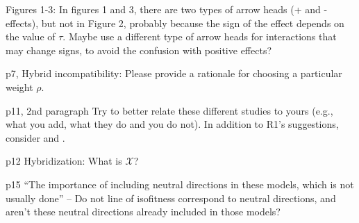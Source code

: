 \begin{point}{Figures 1-3:}
    In figures 1 and 3, there are two types of arrow heads (+ and -
effects), but not in Figure 2, probably because the sign of the effect depends
on the value of $\tau$. Maybe use a  different type of arrow heads for
interactions that may change signs, to avoid the confusion with positive
effects?
\end{point}


\begin{point}{p7, Hybrid incompatibility:}
    Please provide a rationale for choosing a particular weight $\rho$.
\end{point}


\begin{point}{p11, 2nd paragraph}
    Try to better relate these different studies to yours
(e.g., what you add, what they do and you do not). In addition to R1's
suggestions, consider \citet{weinreich2013fishers} and \citet{blanquart2016epistasis}.
\end{point}


\begin{point}{p12 Hybridization:}
    What is $\mathcal{X}$?
\end{point}


\begin{point}{p15}
    ``The importance of including neutral directions in these models, which
is not usually done'' -- Do not line of isofitness correspond to neutral
directions, and aren't these neutral directions already included in those
models?
\end{point}

